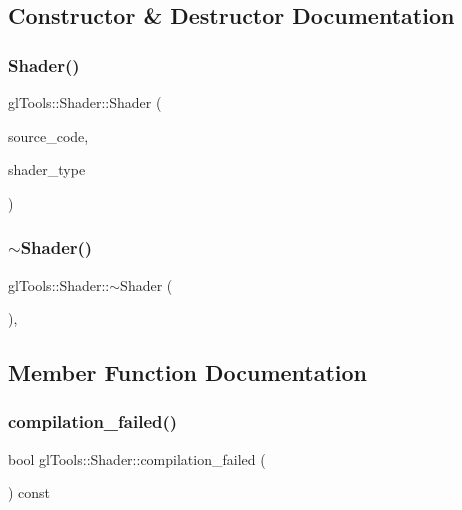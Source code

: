 \subsection{Constructor \& Destructor Documentation}
\mbox{\label{classgl_tools_1_1_shader_ab994fbc0dacea3f5eb9c57f42b4a7d2a}} 
\subsubsection{Shader()}
{\footnotesize\ttfamily gl\+Tools\+::\+Shader\+::\+Shader (\begin{DoxyParamCaption}\item[{const \textbf{ Source\+\_\+\+Code} \&}]{source\+\_\+code,  }\item[{G\+Lenum}]{shader\+\_\+type }\end{DoxyParamCaption})\hspace{0.3cm}{\ttfamily [protected]}}

\mbox{\label{classgl_tools_1_1_shader_aeca1e1b2c0918bf0968b9a01a05dea5e}} 
\subsubsection{$\sim$Shader()}
{\footnotesize\ttfamily gl\+Tools\+::\+Shader\+::$\sim$\+Shader (\begin{DoxyParamCaption}{ }\end{DoxyParamCaption})\hspace{0.3cm}{\ttfamily [protected]}, {\ttfamily [virtual]}}



\subsection{Member Function Documentation}
\mbox{\label{classgl_tools_1_1_shader_a7b32ef86a82b2a620401b91ccb8c551d}} 
\subsubsection{compilation\_failed()}
{\footnotesize\ttfamily bool gl\+Tools\+::\+Shader\+::compilation\+\_\+failed (\begin{DoxyParamCaption}{ }\end{DoxyParamCaption}) const\hspace{0.3cm}{\ttfamily [inline]}}

